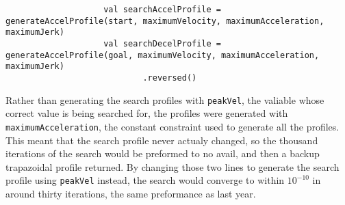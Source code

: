 \documentclass{article}
\begin{document}
\begin{lstlisting}
                    val searchAccelProfile = generateAccelProfile(start, maximumVelocity, maximumAcceleration, maximumJerk)
                    val searchDecelProfile = generateAccelProfile(goal, maximumVelocity, maximumAcceleration, maximumJerk)
                            .reversed()
\end{lstlisting}

Rather than generating the search profiles with \texttt{peakVel}, the valiable whose correct value is being searched for, the profiles were generated with \texttt{maximumAcceleration}, the constant constraint used to generate all the profiles. This meant that the search profile never actualy changed, so the thousand iterations of the search would be preformed to no avail, and then a backup trapazoidal profile returned. By changing those two  lines to generate the search profile using \texttt{peakVel} instead, the search would converge to within $10^{-10}$ in around thirty iterations, the same preformance as last year. 
\end{document}
